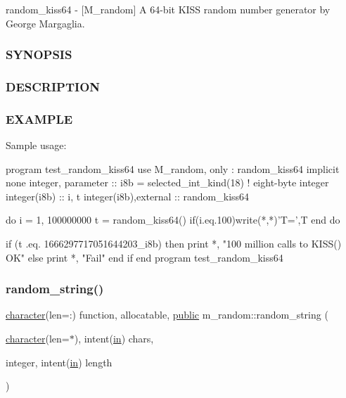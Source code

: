 random\+\_\+kiss64 -\/ \mbox{[}M\+\_\+random\mbox{]} A 64-\/bit K\+I\+SS random number generator by George Margaglia. \subsubsection*{S\+Y\+N\+O\+P\+S\+IS}

\subsubsection*{D\+E\+S\+C\+R\+I\+P\+T\+I\+ON}

\subsubsection*{E\+X\+A\+M\+P\+LE}

\begin{DoxyVerb}Sample usage:

 program test_random_kiss64
 use M_random, only : random_kiss64
   implicit none
   integer, parameter    :: i8b = selected_int_kind(18)  ! eight-byte integer
   integer(i8b)          :: i, t
   integer(i8b),external :: random_kiss64

   do i = 1, 100000000
      t = random_kiss64()
      if(i.eq.100)write(*,*)'T=',T
   end do

   if (t .eq. 1666297717051644203_i8b) then
      print *, "100 million calls to KISS() OK"
   else
      print *, "Fail"
   end if
 end program test_random_kiss64 \end{DoxyVerb}
 \mbox{\label{namespacem__random_aec553bcbd72af521bc24d9f81aea5652}} 
\subsubsection{\texorpdfstring{random\+\_\+string()}{random\_string()}}
{\footnotesize\ttfamily \hyperlink{option__stopwatch_83_8txt_abd4b21fbbd175834027b5224bfe97e66}{character}(len=\+:) function, allocatable, \hyperlink{M__stopwatch_83_8txt_a2f74811300c361e53b430611a7d1769f}{public} m\+\_\+random\+::random\+\_\+string (\begin{DoxyParamCaption}\item[{\hyperlink{option__stopwatch_83_8txt_abd4b21fbbd175834027b5224bfe97e66}{character}(len=$\ast$), intent(\hyperlink{M__journal_83_8txt_afce72651d1eed785a2132bee863b2f38}{in})}]{chars,  }\item[{integer, intent(\hyperlink{M__journal_83_8txt_afce72651d1eed785a2132bee863b2f38}{in})}]{length }\end{DoxyParamCaption})}



